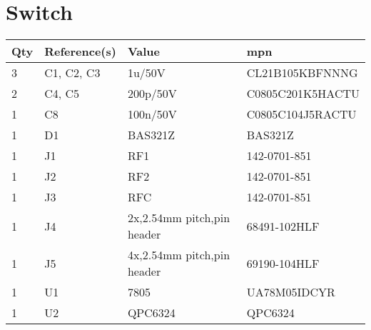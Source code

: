 \section{Switch}
\begin{center}
    \begin{tabular}{@{} llll @{}}
        \toprule
        Qty & Reference(s) & Value                      & \acrshort{mpn}   \\
        \midrule
        3   & C1, C2, C3   & 1u/50V                     & CL21B105KBFNNNG  \\
        2   & C4, C5       & 200p/50V                   & C0805C201K5HACTU \\
        1   & C8           & 100n/50V                   & C0805C104J5RACTU \\
        1   & D1           & BAS321Z                    & BAS321Z          \\
        1   & J1           & RF1                        & 142-0701-851     \\
        1   & J2           & RF2                        & 142-0701-851     \\
        1   & J3           & RFC                        & 142-0701-851     \\
        1   & J4           & 2x,2.54mm pitch,pin header & 68491-102HLF     \\
        1   & J5           & 4x,2.54mm pitch,pin header & 69190-104HLF     \\
        1   & U1           & 7805                       & UA78M05IDCYR     \\
        1   & U2           & QPC6324                    & QPC6324          \\
        \bottomrule
    \end{tabular}
\end{center}

\newpage
